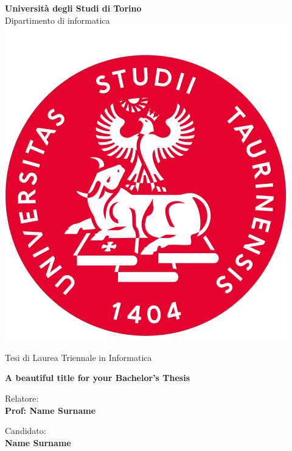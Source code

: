\begin{titlepage}

\begin{center}
    \textbf{\huge{Università degli Studi di Torino}}
    \vspace{2mm}
    \\ \LARGE{Dipartimento di informatica}
    \vspace{5mm}
    \\ \includegraphics[keepaspectratio=true,scale=0.4]{images/unito_logo.png}
    \vspace{5mm}
\end{center}

\begin{center}
    \LARGE{Tesi di Laurea Triennale in Informatica} 
\end{center}

\vspace{15mm}
\begin{center}
    \textbf{\huge{ A beautiful title for your Bachelor's Thesis }}
\end{center}
\vspace{30mm}

\begin{minipage}[t]{0.47\textwidth}
	{\large{Relatore:}{\normalsize\vspace{3mm}
	\bf\\ \large{Prof: Name Surname} \normalsize\vspace{3mm}\bf}}
\end{minipage}
\hfill
\begin{minipage}[t]{0.47\textwidth}\raggedleft
	{\large{Candidato:}{\normalsize\vspace{3mm} \bf\\ \large{Name Surname}}}
\end{minipage}

\vspace{40 mm}
\hrulefill
\\ 

\end{titlepage}
